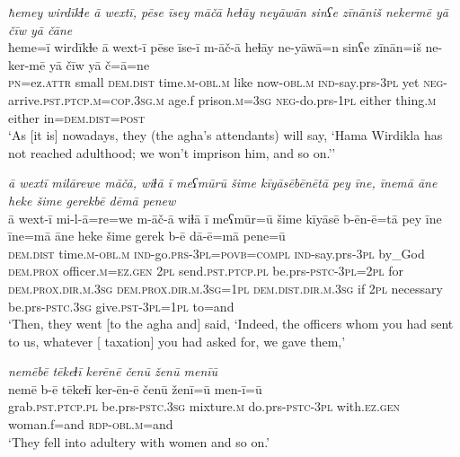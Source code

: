 \ea \label{BP.123}
\textit{ħemey wirdīkɫe ā wextī, pēse īsey māčā heɫāy neyāwān sinʕe zīnāniš nekermē yā čīw yā čāne} \\ 
\gll ħeme=ī wirdīkɫe ā wext-ī pēse īse-ī m-āč-ā heɫāy ne-yāwā=n sinʕe zīnān=iš ne-ker-mē yā čīw yā č=ā=ne \\ 
 \textsc{pn}=ez.\textsc{attr} small \textsc{dem.dist} time\textsc{.m}\textsc{-obl}\textsc{.m} like now\textsc{-obl}\textsc{.m} \textsc{ind-}say.prs\textsc{-3pl} yet \textsc{neg-}arrive\textsc{.pst}\textsc{.ptcp}\textsc{.m}\textsc{=cop}\textsc{.3sg}\textsc{.m} age.f prison\textsc{.m}\textsc{=3sg} \textsc{neg-}do.prs\textsc{-\textsc{1pl}} either thing\textsc{.m} either in=\textsc{dem.dist}\textsc{=\textsc{post}} \\ 
\glt `As [it is] nowadays, they (the agha’s attendants) will say, ‘Hama Wirdikla has not reached adulthood; we won’t imprison him, and so on.’'
\z 
 
\ea \label{BP.124}
\textit{ā wextī milārewe māčā, wiɫā ī meʕmūrū šime kīyāsēbēnētā pey īne, īnemā āne heke šime gerekbē dēmā penew} \\ 
\gll ā wext-ī mi-l-ā=re=we m-āč-ā wiɫā ī meʕmūr=ū šime kīyāsē b-ēn-ē=tā pey īne īne=mā āne heke šime gerek b-ē dā-ē=mā pene=ū \\ 
 \textsc{dem.dist} time\textsc{.m}\textsc{-obl}\textsc{.m} \textsc{ind-}go.\textsc{prs}\textsc{-3pl}\textsc{=\textsc{povb}}\textsc{=compl} \textsc{ind-}say.prs\textsc{-3pl} by\_God \textsc{dem.prox} officer\textsc{.m}\textsc{=ez.gen} \textsc{2pl} send\textsc{.pst}\textsc{.ptcp}\textsc{.pl} be.prs\textsc{-pstc}\textsc{-3pl}=\textsc{2pl} for \textsc{dem.prox}\textsc{.dir}\textsc{.m}\textsc{.3sg} \textsc{dem.prox}\textsc{.dir}\textsc{.m}\textsc{.3sg}\textsc{=\textsc{1pl}} \textsc{dem.dist}\textsc{.dir}\textsc{.m}\textsc{.3sg} if \textsc{2pl} necessary be.prs\textsc{-pstc}\textsc{.3sg} give\textsc{.pst}\textsc{-3pl}\textsc{=\textsc{1pl}} to=and \\ 
\glt `Then, they went [to the agha and] said, ‘Indeed, the officers whom you had sent to us, whatever [ taxation] you had asked for, we gave them,'
\z 
 
\ea \label{BP.126}
\textit{nemēbē tēkeɫī kerēnē čenū ženū menīū} \\ 
\gll nemē b-ē tēkeɫī ker-ēn-ē čenū ženī=ū men-ī=ū \\ 
 grab\textsc{.pst}\textsc{.ptcp}\textsc{.pl} be.prs\textsc{-pstc}\textsc{.3sg} mixture\textsc{.m} do.prs\textsc{-pstc}\textsc{-3pl} with\textsc{.ez.gen} woman.f=and \textsc{rdp}\textsc{-obl}\textsc{.m}=and \\ 
\glt `They fell into adultery with women and so on.'
\z 
 
